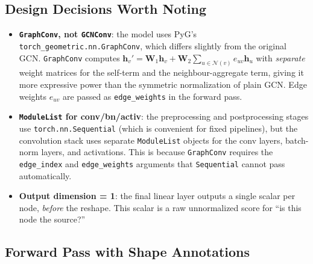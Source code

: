 \subsection{Design Decisions Worth Noting}

\begin{itemize}
    \item \textbf{\texttt{GraphConv}, not \texttt{GCNConv}}: the model uses PyG's \texttt{torch\_geometric.nn.GraphConv}, which differs slightly from the original GCN. \texttt{GraphConv} computes $\mathbf{h}_v' = \mathbf{W}_1 \mathbf{h}_v + \mathbf{W}_2 \sum_{u \in \mathcal{N}(v)} e_{uv} \mathbf{h}_u$ with \emph{separate} weight matrices for the self-term and the neighbour-aggregate term, giving it more expressive power than the symmetric normalization of plain GCN. Edge weights $e_{uv}$ are passed as \texttt{edge\_weights} in the forward pass.
    \item \textbf{\texttt{ModuleList} for conv/bn/activ}: the preprocessing and postprocessing stages use \texttt{torch.nn.Sequential} (which is convenient for fixed pipelines), but the convolution stack uses separate \texttt{ModuleList} objects for the conv layers, batch-norm layers, and activations. This is because \texttt{GraphConv} requires the \texttt{edge\_index} and \texttt{edge\_weights} arguments that \texttt{Sequential} cannot pass automatically.
    \item \textbf{Output dimension = 1}: the final linear layer outputs a single scalar per node, \emph{before} the reshape. This scalar is a raw unnormalized score for ``is this node the source?''
\end{itemize}

\subsection{Forward Pass with Shape Annotations}

